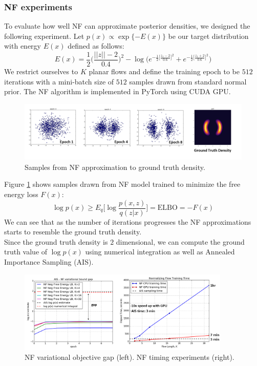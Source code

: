 \subsubsection{NF experiments}

To evaluate how well NF can approximate posterior densities, we designed the following experiment. Let $p(x) \propto \exp\{-E(x)\}$ be our target distribution with energy $E(x)$ defined as follows:
\begin{equation}
    E(x) = \frac{1}{2}\bigg(\frac{||z||-2}{0.4}\bigg)^{2} - \log \bigg(e^{-\frac{1}{2}\big[\frac{z_1-2}{0.6}\big]^{2}} + e^{-\frac{1}{2}\big[\frac{z_1+2}{0.6}\big]^{2}} \bigg)
\end{equation}
We restrict ourselves to $K$ planar flows and define the training epoch to be $512$ iterations with a mini-batch size of $512$ samples drawn from standard normal prior. The NF algorithm is implemented in PyTorch using CUDA GPU. 

\begin{figure}[thpb]
    \centering
    \includegraphics[width=\textwidth, trim={10 10 10 10}]{figures/nf_exp1.png}
    \caption{Samples from NF approximation to ground truth density.}
    \label{fig:nf_exp1}
\end{figure}

Figure \ref{fig:nf_exp1} shows samples drawn from NF model trained to minimize the free energy loss $F(x)$:
\begin{equation}
    \log p(x) \geq E_q\bigg[\log \frac{p(x,z)}{q(z|x)}\bigg] = \mathrm{ELBO} = -F(x)
\end{equation}
We can see that as the number of iterations progresses the NF approximations starts to resemble the ground truth density.\\

Since the ground truth density is $2$ dimensional, we can compute the ground truth value of $\log p(x)$ using numerical integration as well as Annealed Importance Sampling (AIS).

\begin{figure}[thpb]
    \centering
    \includegraphics[width=0.9\textwidth, trim={10 10 10 10}]{figures/nf_exp2.png}
    \caption{NF variational objective gap (left). NF timing experiments (right).}
    \label{fig:nf_exp2}
\end{figure}

